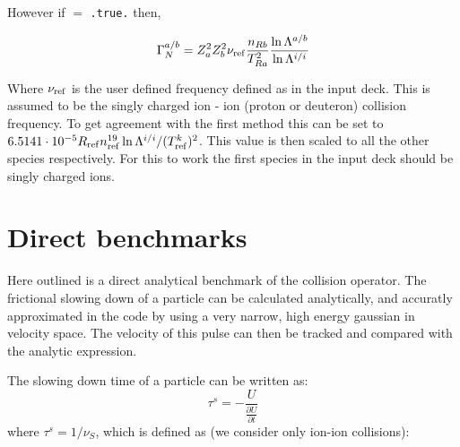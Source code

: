 However if  $=$ \texttt{.true.} then,

\begin{equation}
\Gamma^{a/b}_N =  Z_a^2 Z_b^2 \nu_{\rm ref} \frac{n_{Rb}}{T_{Ra}^2} \frac{\ln \Lambda^{a/b}}{\ln \Lambda^{i/i}}
\end{equation}

Where $\nu_{\rm ref}$ is the user defined frequency defined as  in the input deck.  This is assumed to be the singly charged ion - ion (proton or deuteron) collision frequency.  To get agreement with the first method this can be set to $6.5141\cdot 10^{-5}R_{\rm ref}n_{\rm ref}^{19}\ln \Lambda^{i/i}/(T_{\rm ref}^k)^2$.  This value is then scaled to all the other species respectively.  For this to work the first species in the input deck should be singly charged ions.

\section{Direct benchmarks}

Here outlined is a direct analytical benchmark of the collision operator. The frictional slowing down of a particle can be calculated 
analytically, and accuratly approximated in the code by using a very narrow, high energy gaussian in velocity space.  The velocity
of this pulse can then be tracked and compared with the analytic expression.

The slowing down time of a particle can be written as:
\begin{equation}
\tau^{s} = - \frac{U}{\frac{\partial U}{\partial t}}
\end{equation}
where $\tau^{s} = 1/\nu_{S}$, which is defined as (we consider only ion-ion collisions):

